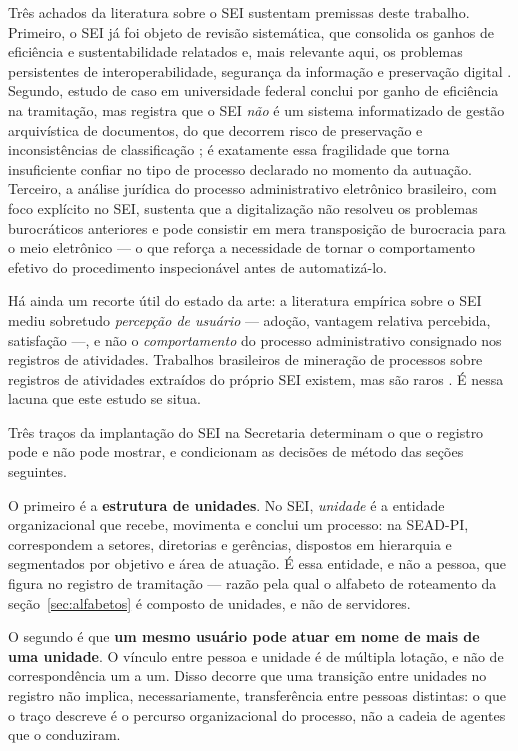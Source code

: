 Três achados da literatura sobre o SEI sustentam premissas deste trabalho. Primeiro, o SEI já foi objeto de
revisão sistemática, que consolida os ganhos de eficiência e sustentabilidade relatados e, mais
relevante aqui, os problemas persistentes de interoperabilidade, segurança da informação e
preservação digital \cite{soriano2025sei}. Segundo, estudo de caso em universidade federal conclui
por ganho de eficiência na tramitação, mas registra que o SEI \emph{não} é um sistema informatizado
de gestão arquivística de documentos, do que decorrem risco de preservação e inconsistências de
classificação \cite{silva2020gestao}; é exatamente essa fragilidade que torna insuficiente confiar
no tipo de processo declarado no momento da autuação. Terceiro, a análise jurídica do processo
administrativo eletrônico brasileiro, com foco explícito no SEI, sustenta que a digitalização não
resolveu os problemas burocráticos anteriores e pode consistir em mera transposição de burocracia
para o meio eletrônico \cite{baptista2023processo} --- o que reforça a necessidade de tornar o
comportamento efetivo do procedimento inspecionável antes de automatizá-lo.

Há ainda um recorte útil do estado da arte: a literatura empírica sobre o SEI mediu sobretudo
\emph{percepção de usuário} --- adoção, vantagem relativa percebida, satisfação
\cite{fulton2018adocao} ---, e não o \emph{comportamento} do processo administrativo consignado nos registros de atividades. Trabalhos brasileiros de mineração de processos sobre registros de atividades extraídos do próprio SEI
existem, mas são raros \cite{limaesilva2026analise}. É nessa lacuna que este estudo se situa.

Três traços da implantação do SEI na Secretaria determinam o que o registro pode e não pode
mostrar, e condicionam as decisões de método das seções seguintes.

O primeiro é a \textbf{estrutura de unidades}. No SEI, \emph{unidade} é a entidade organizacional
que recebe, movimenta e conclui um processo: na SEAD-PI, correspondem a setores, diretorias e
gerências, dispostos em hierarquia e segmentados por objetivo e área de atuação. É essa entidade,
e não a pessoa, que figura no registro de tramitação --- razão pela qual o alfabeto de roteamento
da seção~\ref{sec:alfabetos} é composto de unidades, e não de servidores.

O segundo é que \textbf{um mesmo usuário pode atuar em nome de mais de uma unidade}. O vínculo
entre pessoa e unidade é de múltipla lotação, e não de correspondência um a um. Disso decorre que
uma transição entre unidades no registro não implica, necessariamente, transferência entre
pessoas distintas: o que o traço descreve é o percurso organizacional do processo, não a cadeia
de agentes que o conduziram.

